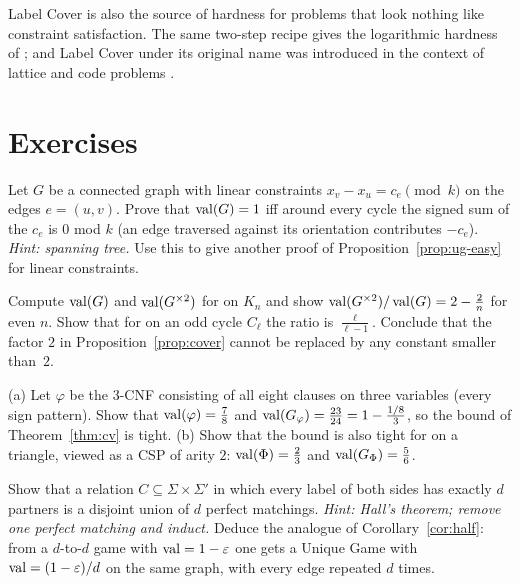 Label Cover is also the source of hardness for problems that look nothing like constraint satisfaction.  The same two-step recipe gives the logarithmic hardness of 
\citep{LundYannakakis94,Feige98,DinurSteurer14}; and Label Cover under its original name was introduced in the context of lattice and code problems \citep{ABSS97}.


\section*{Exercises}

\begin{exercise}[\stars{$\star$}]\label{ex:holonomy}
Let $G$ be a connected graph with linear constraints $x_v-x_u=c_e\pmod k$ on the edges $e=(u,v)$.  Prove that $\operatorname{val}(G)=1$ iff around every cycle the signed sum of the $c_e$ is $0$ mod $k$ (an edge traversed against
its orientation contributes $-c_e$).  \emph{Hint: spanning tree.}  Use this to give another proof of Proposition~\ref{prop:ug-easy} for linear constraints.
\end{exercise}

\begin{exercise}[\stars{$\star\star$}]\label{ex:cover-tight}
Compute $\operatorname{val}(G)$ and $\operatorname{val}(G^{\times2})$ for  on $K_n$ and show $\operatorname{val}(G^{\times2})/\operatorname{val}(G)=2-\tfrac2n$ for even $n$.  Show that for  on an odd cycle $C_\ell$ the ratio is $\tfrac\ell{\ell-1}$.  Conclude that the factor $2$ in Proposition~\ref{prop:cover} cannot be replaced by any constant smaller than~$2$.
\end{exercise}

\begin{exercise}[\stars{$\star\star$}]\label{ex:cv-tight}
(a) Let $\varphi$ be the $3$-CNF consisting of all eight clauses on three variables (every sign pattern).  Show that $\operatorname{val}(\varphi)=\tfrac78$ and $\operatorname{val}(G_\varphi)=\tfrac{23}{24}=1-\tfrac{1/8}3$, so the bound of Theorem~\ref{thm:cv} is tight.
(b) Show that the bound is also tight for  on a triangle, viewed as a CSP of arity $2$: $\operatorname{val}(\Phi)=\tfrac23$ and $\operatorname{val}(G_\Phi)=\tfrac56$.
\end{exercise}

\begin{exercise}[\stars{$\star\star$}]\label{ex:dreg}
Show that a relation $C\subseteq\Sigma\times\Sigma'$ in which every label of both sides has exactly $d$ partners is a disjoint union of $d$ perfect matchings.  \emph{Hint: Hall's theorem; remove one perfect matching and induct.}
Deduce the analogue of Corollary~\ref{cor:half}: from a $d$-to-$d$ game with $\operatorname{val}=1-\varepsilon$ one gets a Unique Game with $\operatorname{val}=(1-\varepsilon)/d$ on the same graph, with every edge repeated $d$ times.
\end{exercise}

